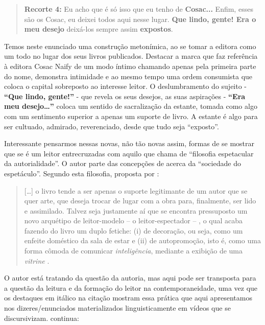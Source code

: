 \begin{quote}
\textbf{Recorte 4:}
Eu acho que é só isso que eu tenho de \textbf{Cosac...}
Enfim, esses são os Cosac, eu deixei todos aqui nesse lugar.
\textbf{Que lindo, gente! Era o meu desejo} deixá-los sempre
assim \textbf{expostos}.
\end{quote}

Temos neste enunciado uma construção metonímica, ao se tomar a editora
como um todo no lugar dos seus livros publicados. Destacar a marca que
faz referência à editora Cosac Naify de um modo íntimo chamando apenas
pela primeira parte do nome, demonstra intimidade e ao mesmo tempo uma
ordem consumista que coloca o capital sobreposto ao interesse leitor. O
deslumbramento do sujeito - \textbf{\enquote{Que lindo, gente!}} - que revela
os seus desejos, as suas aspirações - \textbf{\enquote{Era meu desejo\ldots}}
coloca um sentido de sacralização da estante, tomada como algo com um
sentimento superior a apenas um suporte de livro. A estante é algo para
ser cultuado, admirado, reverenciado, desde que tudo seja \enquote{exposto}.

Interessante pensarmos nessas novas, não tão novas assim, formas de se
mostrar que se é um leitor entrecruzadas com aquilo que \textcite{galinari2005autorialidade}
chama de \enquote{filosofia espetacular da autorialidade}. O autor parte das
concepções de \textcite{debord_sociedade_1997,subirats_cultura_1989} acerca da \enquote{sociedade do
espetáculo}. Segundo esta filosofia, proposta por \textcite{galinari2005autorialidade}:

\begin{quote}
[\ldots] o livro tende a ser apenas o suporte legitimante de um
autor que se quer arte, que deseja trocar de lugar com a obra para,
finalmente, ser lido e assimilado. Talvez seja justamente aí que se
encontra pressuposto um novo arquétipo de leitor-modelo -- o
leitor-espectador -- , o qual acaba fazendo do livro um duplo fetiche:
(i) de decoração, ou seja, como um enfeite doméstico da sala de estar e
(ii) de autopromoção, isto é, como uma forma cômoda de comunicar
\textit{inteligência}, mediante a exibição de uma \textit{vitrine}
\cite[p. 52–53]{galinari2005autorialidade}.
\end{quote}

O autor está tratando da questão da autoria, mas aqui pode ser
transposta para a questão da leitura e da formação do leitor na
contemporaneidade, uma vez que os destaques em itálico na citação
mostram essa prática que aqui apresentamos nos dizeres/enunciados
materializados linguisticamente em vídeos que se discursivizam. \textcite{galinari2005autorialidade} continua:

